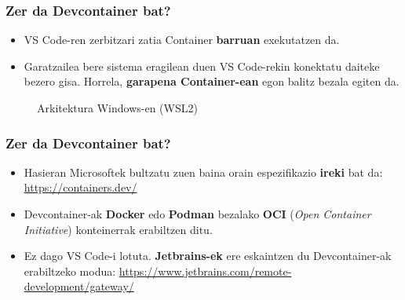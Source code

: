 \documentclass[lang=eu,biz=foe,aspectratio=169,handout]{mupresentation}
\begin{document}
\begin{frame}
  \frametitle{Zer da Devcontainer bat?}
  \begin{itemize}
    \item VS Code-ren zerbitzari zatia Container \textbf{barruan} exekutatzen da.
    \item Garatzailea bere sistema eragilean duen VS Code-rekin konektatu daiteke bezero gisa. Horrela, \textbf{garapena Container-ean} egon balitz bezala egiten da.
  \end{itemize}
  \begin{figure}[ht]
    \centering
    \caption{Arkitektura Windows-en (WSL2)}
    \label{fig:devcontainer_windows}
  \end{figure}
\end{frame}

\begin{frame}
  \frametitle{Zer da Devcontainer bat?}
  \begin{itemize}
    \item Hasieran Microsoftek bultzatu zuen baina orain espezifikazio \textbf{ireki} bat da:
      \url{https://containers.dev/}
    \item Devcontainer-ak \textbf{Docker} edo \textbf{Podman} bezalako \textbf{OCI} (\textit{Open Container Initiative}) konteinerrak erabiltzen ditu.
    \item Ez dago VS Code-i lotuta. \textbf{Jetbrains-ek} ere eskaintzen du Devcontainer-ak erabiltzeko modua: \url{https://www.jetbrains.com/remote-development/gateway/}
  \end{itemize}
\end{frame}
\end{document}
